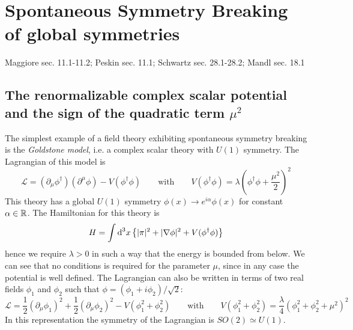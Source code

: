 \documentclass[TheoreticalPhy_ModB.tex]{subfiles}
\begin{document}
\section{Spontaneous Symmetry Breaking of global symmetries}
\textsf{Maggiore sec. 11.1-11.2; Peskin sec. 11.1; Schwartz sec. 28.1-28.2; Mandl sec. 18.1}\\

\subsection{The renormalizable complex scalar potential and the sign of the quadratic term $\mu^2$}

The simplest example of a field theory exhibiting spontaneous symmetry breaking is the \emph{Goldstone model}, i.e. a complex scalar theory with $U(1)$ symmetry. The Lagrangian of this model is
\[\mathcal L=(\partial_\mu\phi^\dagger)(\partial^\mu\phi)-V(\phi^\dagger\phi)
\qquad \text{with}\qquad
V(\phi^\dagger\phi)=\lambda\left(\phi^\dagger\phi+\frac{\mu^2}2\right)^2
\]
This theory has a global $U(1)$ symmetry $\phi(x)\to e^{i\alpha}\phi(x)$ for constant $\alpha\in\mathbb{R}$. The Hamiltonian for this theory is
\[H=\int\textup{d}^3x\left\{|\pi|^2+|\mathbf\nabla\phi|^2+V(\phi^\dagger\phi)\right\}\]
hence we require $\lambda>0$ in such a way that the energy is bounded from below. We can see that no conditions is required for the parameter $\mu$, since in any case the potential is well defined. The Lagrangian can also be written in terms of two real fields $\phi_1$ and $\phi_2$ such that $\phi=(\phi_1+i\phi_2)/{\sqrt2}$:
\[\mathcal L=\frac12(\partial_\mu\phi_1)^2+\frac12(\partial_\mu\phi_2)^2-V(\phi_1^2+\phi_2^2)
\qquad \text{with}\qquad
V(\phi_1^2+\phi_2^2)=\frac\lambda4\left(\phi_1^2+\phi_2^2+\mu^2\right)^2
\]
In this representation the symmetry of the Lagrangian is $SO(2)\simeq U(1)$.
\end{document}
